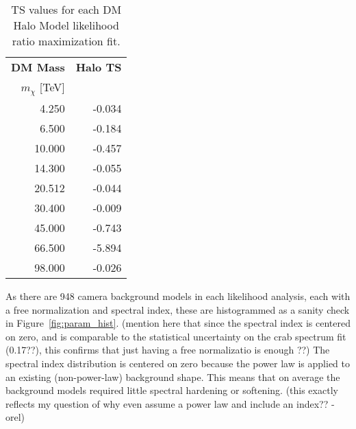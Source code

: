   \begin{table}[!t]
    \centering
    \begin{tabular}{|r|r|}
      \hline
      \textbf{DM Mass}        & \textbf{Halo TS} \\
      \textbf{$m_\chi$} [TeV] &                  \\
      \hline 
       4.250 & -0.034 \\
       6.500 & -0.184 \\
      10.000 & -0.457 \\
      14.300 & -0.055 \\
      20.512 & -0.044 \\
      30.400 & -0.009 \\
      45.000 & -0.743 \\
      66.500 & -5.894 \\
      98.000 & -0.026 \\

      \hline 
    \end{tabular}
    \caption[DM Halo TS Values]{
      TS values for each DM Halo Model likelihood ratio maximization fit.
    }
    \label{tab:tsvals}
  \end{table}

  As there are 948 camera background models in each likelihood analysis, each with a free normalization and spectral index, these are histogrammed as a sanity check in Figure~\ref{fig:param_hist}.
  {\color{red}(mention here that since the spectral index is centered on zero, and is comparable to the statistical uncertainty on the crab spectrum fit (0.17??), this confirms that just having a free normalizatio is enough ??)}
  The spectral index distribution is centered on zero because the power law is applied to an existing (non-power-law) background shape.
  This means that on average the background models required little spectral hardening or softening.
  {\color{red}(this exactly reflects my question of why even assume a power law and include an index?? -orel)}
  
